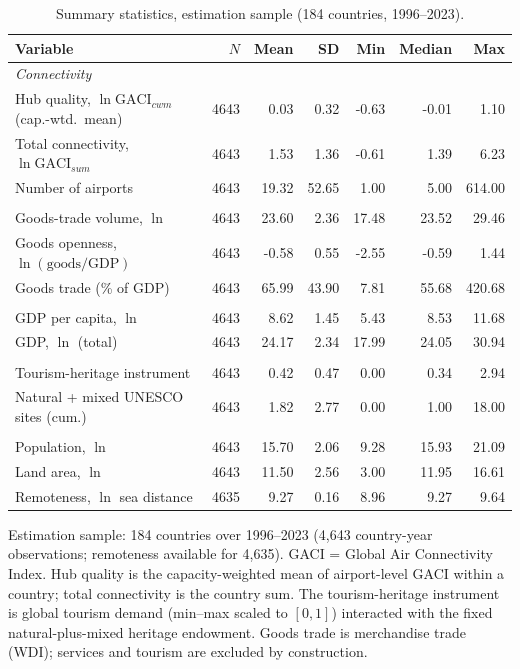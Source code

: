 \begin{table}[t]
\centering
\caption{Summary statistics, estimation sample (184 countries, 1996--2023).}
\label{tab:sumstat}
\begin{threeparttable}
\small
\begin{tabular}{lrrrrrr}
\toprule
Variable & $N$ & Mean & SD & Min & Median & Max \\
\midrule
\multicolumn{7}{l}{\emph{Connectivity}}\\
Hub quality, $\ln\mathrm{GACI}_{cwm}$ (cap.-wtd.\ mean) & 4643 & 0.03 & 0.32 & -0.63 & -0.01 & 1.10 \\
Total connectivity, $\ln\mathrm{GACI}_{sum}$ & 4643 & 1.53 & 1.36 & -0.61 & 1.39 & 6.23 \\
Number of airports & 4643 & 19.32 & 52.65 & 1.00 & 5.00 & 614.00 \\
\addlinespace
\multicolumn{7}{l}{\emph{Trade outcomes}}\\
Goods-trade volume, $\ln$ & 4643 & 23.60 & 2.36 & 17.48 & 23.52 & 29.46 \\
Goods openness, $\ln(\text{goods}/\text{GDP})$ & 4643 & -0.58 & 0.55 & -2.55 & -0.59 & 1.44 \\
Goods trade (\% of GDP) & 4643 & 65.99 & 43.90 & 7.81 & 55.68 & 420.68 \\
\addlinespace
\multicolumn{7}{l}{\emph{Income}}\\
GDP per capita, $\ln$ & 4643 & 8.62 & 1.45 & 5.43 & 8.53 & 11.68 \\
GDP, $\ln$ (total) & 4643 & 24.17 & 2.34 & 17.99 & 24.05 & 30.94 \\
\addlinespace
\multicolumn{7}{l}{\emph{Instrument and heritage}}\\
Tourism-heritage instrument & 4643 & 0.42 & 0.47 & 0.00 & 0.34 & 2.94 \\
Natural + mixed UNESCO sites (cum.) & 4643 & 1.82 & 2.77 & 0.00 & 1.00 & 18.00 \\
\addlinespace
\multicolumn{7}{l}{\emph{Controls}}\\
Population, $\ln$ & 4643 & 15.70 & 2.06 & 9.28 & 15.93 & 21.09 \\
Land area, $\ln$ & 4643 & 11.50 & 2.56 & 3.00 & 11.95 & 16.61 \\
Remoteness, $\ln$ sea distance & 4635 & 9.27 & 0.16 & 8.96 & 9.27 & 9.64 \\
\bottomrule
\end{tabular}
\begin{tablenotes}\footnotesize
\item Estimation sample: 184 countries over 1996--2023 (4{,}643 country-year observations; remoteness available for 4{,}635). GACI = Global Air Connectivity Index. Hub quality is the capacity-weighted mean of airport-level GACI within a country; total connectivity is the country sum. The tourism-heritage instrument is global tourism demand (min--max scaled to $[0,1]$) interacted with the fixed natural-plus-mixed heritage endowment. Goods trade is merchandise trade (WDI); services and tourism are excluded by construction.
\end{tablenotes}
\end{threeparttable}
\end{table}
